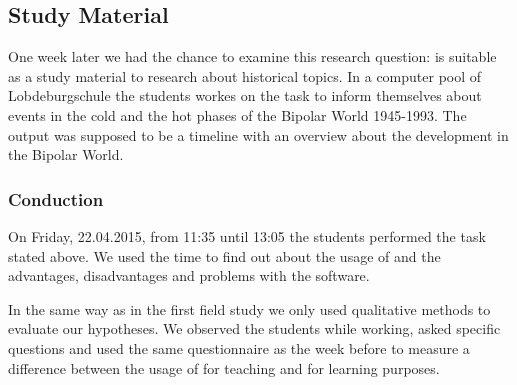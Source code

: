 

\subsection{Study Material} %
\label{sub:usage_as_study_material}

One week later we had the chance to examine this research question: \HG is suitable as a study material to research about historical topics. In a computer pool of Lobdeburgschule the students workes on the task to inform themselves about events in the cold and the hot phases of the Bipolar World 1945-1993. The output was supposed to be a timeline with an overview about the development in the Bipolar World.


\subsubsection{Conduction} %
\label{ssub:conduction-2}
On Friday, 22.04.2015, from 11:35 until 13:05 the students performed the task stated above. We used the time to find out about the usage of \HG and the advantages, disadvantages and problems with the software.

In the same way as in the first field study we only used qualitative methods to evaluate our hypotheses. We observed the students while working, asked specific questions and used the same questionnaire as the week before to measure a difference between the usage of \HG for teaching and for learning purposes.

